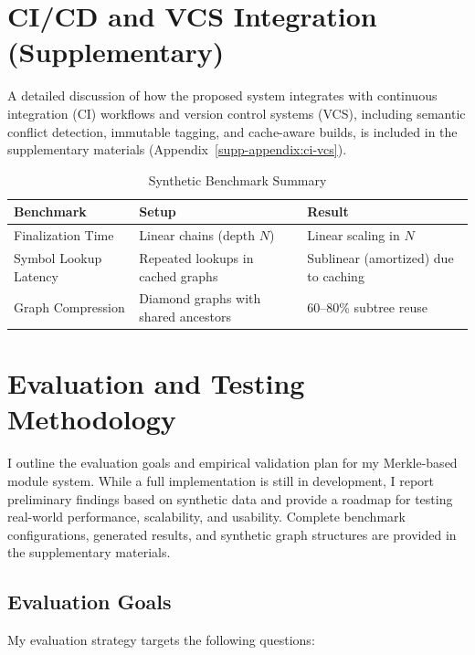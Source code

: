 \documentclass[sigplan,screen]{acmart}
\begin{document}
\section{CI/CD and VCS Integration (Supplementary)}
\label{sec:ci-vcs-integration}

A detailed discussion of how the proposed system integrates with continuous integration (CI) workflows and version control systems (VCS), including semantic conflict detection, immutable tagging, and cache-aware builds, is included in the supplementary materials (Appendix~\ref{supp-appendix:ci-vcs}).

\begin{table}[t]
\centering
\caption{Synthetic Benchmark Summary}
\label{tab:synthetic-benchmarks}
\begin{tabular}{@{}lll@{}}
\toprule
\textbf{Benchmark}           & \textbf{Setup}                         & \textbf{Result}                   \\ \midrule
Finalization Time            & Linear chains (depth \(N\))            & Linear scaling in \(N\)           \\
Symbol Lookup Latency        & Repeated lookups in cached graphs      & Sublinear (amortized) due to caching \\
Graph Compression            & Diamond graphs with shared ancestors   & 60–80\% subtree reuse             \\ \bottomrule
\end{tabular}
\end{table}

\section{Evaluation and Testing Methodology}
\label{sec:evaluation}

I outline the evaluation goals and empirical validation plan for my Merkle-based module system. While a full implementation is still in development, I report preliminary findings based on synthetic data and provide a roadmap for testing real-world performance, scalability, and usability. Complete benchmark configurations, generated results, and synthetic graph structures are provided in the supplementary materials.

\subsection{Evaluation Goals}

My evaluation strategy targets the following questions:
\end{document}
